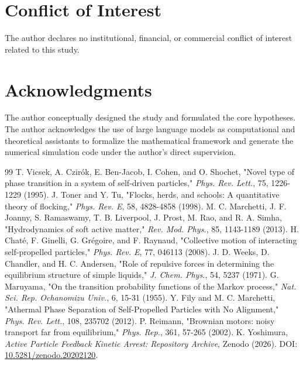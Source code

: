 \documentclass[12pt]{article}
\begin{document}
\section*{Conflict of Interest}
The author declares no institutional, financial, or commercial conflict of interest related to this study.

\section*{Acknowledgments}
The author conceptually designed the study and formulated the core hypotheses. The author acknowledges the use of large language models as computational and theoretical assistants to formalize the mathematical framework and generate the numerical simulation code under the author's direct supervision.

\begin{thebibliography}{99}
 T. Vicsek, A. Czirók, E. Ben-Jacob, I. Cohen, and O. Shochet, "Novel type of phase transition in a system of self-driven particles," \textit{Phys. Rev. Lett.}, 75, 1226-1229 (1995).
 J. Toner and Y. Tu, "Flocks, herds, and schools: A quantitative theory of flocking," \textit{Phys. Rev. E}, 58, 4828-4858 (1998).
 M. C. Marchetti, J. F. Joanny, S. Ramaswamy, T. B. Liverpool, J. Prost, M. Rao, and R. A. Simha, "Hydrodynamics of soft active matter," \textit{Rev. Mod. Phys.}, 85, 1143-1189 (2013).
 H. Chaté, F. Ginelli, G. Grégoire, and F. Raynaud, "Collective motion of interacting self-propelled particles," \textit{Phys. Rev. E}, 77, 046113 (2008).
 J. D. Weeks, D. Chandler, and H. C. Andersen, "Role of repulsive forces in determining the equilibrium structure of simple liquids," \textit{J. Chem. Phys.}, 54, 5237 (1971).
 G. Maruyama, "On the transition probability functions of the Markov process," \textit{Nat. Sci. Rep. Ochanomizu Univ.}, 6, 15-31 (1955).
 Y. Fily and M. C. Marchetti, "Athermal Phase Separation of Self-Propelled Particles with No Alignment," \textit{Phys. Rev. Lett.}, 108, 235702 (2012).
 P. Reimann, "Brownian motors: noisy transport far from equilibrium," \textit{Phys. Rep.}, 361, 57-265 (2002).
 K. Yoshimura, \textit{Active Particle Feedback Kinetic Arrest: Repository Archive}, Zenodo (2026). DOI: \href{https://doi.org/10.5281/zenodo.20202120}{10.5281/zenodo.20202120}.
\end{thebibliography}
\end{document}
